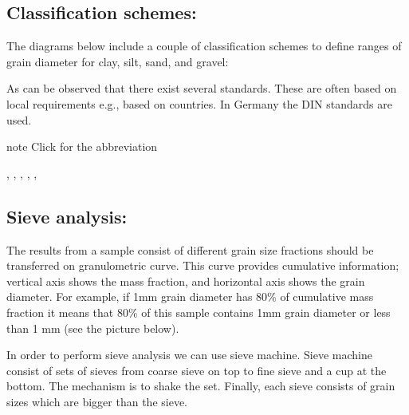 \documentclass[letterpaper,10pt,english]{sphinxmanual}
\let\sphinxpxdimen\pdfpxdimen\else\newdimen\sphinxpxdimen
\begin{document}
\subsection{Classification schemes:}
\label{\detokenize{contents/flow/lecture_02/12_subsurface_structure:classification-schemes}}
The diagrams below include a couple of classification schemes to define ranges of grain diameter for clay, silt, sand, and gravel:

\noindent\sphinxincludegraphics[width=600\sphinxpxdimen]{{L02_fig7}.png}

As can be observed that there exist several standards. These are often based on local requirements e.g., based on countries. In Germany the DIN standards are used.

\begin{sphinxadmonition}{note}{ Click for the abbreviation}

, , , , , 
\end{sphinxadmonition}


\subsection{Sieve analysis:}
\label{\detokenize{contents/flow/lecture_02/12_subsurface_structure:sieve-analysis}}
The results from a sample consist of different grain size fractions should be transferred on granulometric curve. This curve provides cumulative information; vertical axis shows the mass fraction, and horizontal axis shows the grain diameter. For example, if 1mm grain diameter has 80\% of cumulative mass fraction it means that 80\% of this sample contains 1mm grain diameter or less than 1 mm (see the picture below).

In order to perform sieve analysis we can use sieve machine. Sieve machine consist of sets of sieves from coarse sieve on top to fine sieve and a cup at the bottom. The mechanism is to shake the set. Finally, each sieve consists of grain sizes which are bigger than the sieve.

\noindent\sphinxincludegraphics[width=600\sphinxpxdimen]{{L02_fig15}.png}
\end{document}
